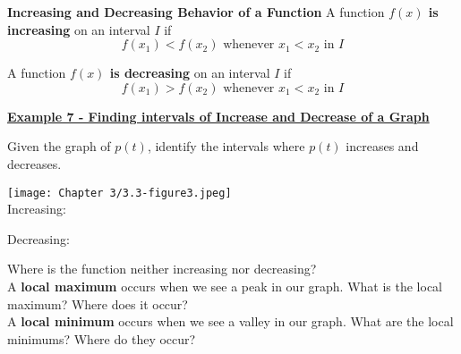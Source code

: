\documentclass[12pt]{book}
\begin{document}
 \begin{comment}
     \underline{\textbf{Example 2 - Finding the Domain of a Function as a Set of Ordered Pairs}}
   
    Find the domain and range of the following function: $$\{ (2,10), (3,10), (4,20), (5,30), (6,40)\}$$
    \vspace{5mm}
    Domain: 
   
    Range: 
 \end{comment}  

\begin{boxR}
    \textbf{Increasing and Decreasing Behavior of a Function}
    \vspace{1mm}
    \hline
    \vspace{2mm}
A function  \textbf{$f(x)$ is increasing} on an interval $I$ if 
$$ f(x_1) < f(x_2) \text{ whenever } x_1 < x_2 \text{ in } I$$ 
 

A function  \textbf{$f(x)$ is decreasing} on an interval $I$ if 
$$ f(x_1) > f(x_2) \text{ whenever } x_1 < x_2 \text{ in } I$$ 
\end{boxR}

\vspace{1mm}

\underline{\textbf{Example 7 - Finding intervals of Increase and Decrease of a Graph}}

Given the graph of $p(t)$, identify the intervals where $p(t)$ increases and decreases.

\begin{multicols}{2}
\texttt{[image: Chapter 3/3.3-figure3.jpeg]}
\\

Increasing: 
\\
\vspace{5mm}

Decreasing: 
\end{multicols}

\vspace{5mm}

Where is the function neither increasing nor decreasing? 
\\

A \textbf{local maximum} occurs when we see a peak in our graph. What is the local maximum? Where does it occur? 
\\

A \textbf{local minimum} occurs when we see a valley in our graph. What are the local minimums? Where do they occur?
\end{document}
